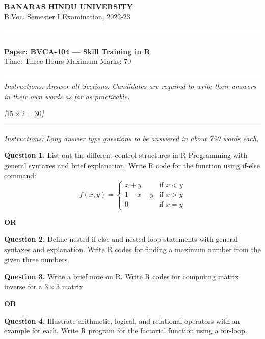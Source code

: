 \documentclass[11pt,a4paper]{article}
\newcommand{\pts}[1]{\hfill   \textit{[#1]}}
\begin{document}
\begin{center}
  {\large\bfseries BANARAS HINDU UNIVERSITY}\\[2pt]
  {\normalsize B.Voc. Semester I Examination, 2022-23}\\[6pt]
  \rule{0.8\linewidth}{0.5pt}\\[6pt]
  {\large\bfseries Paper: BVCA-104 --- Skill Training in R}\\[4pt]
  {\normalsize Time: Three Hours \hfill Maximum Marks: 70}
\end{center}

\rule{\linewidth}{0.4pt}

\smallskip



\noindent   \textit{Instructions: Answer all Sections. Candidates are required to write their answers in their own words as far as practicable.}

\bigskip

\bigskip


\pts{$15  \times 2 = 30$}
\rule{\linewidth}{0.4pt}\smallskip




\noindent   \textit{Instructions: Long answer type questions to be answered in about 750 words each.}

\medskip


\noindent   \textbf{Question 1.} List out the different control structures in R Programming with general syntaxes and brief explanation. Write R code for the function using if-else command:
\[
f(x, y) = 
\begin{cases}
x + y &  \text{if } x < y \\
1 - x - y &  \text{if } x > y \\
0 &  \text{if } x = y
\end{cases}
\]
\centerline{   \textbf{OR}}

\medskip


\noindent   \textbf{Question 2.} Define nested if-else and nested loop statements with general syntaxes and explanation. Write R codes for finding a maximum number from the given three numbers.

\medskip


\noindent   \textbf{Question 3.} Write a brief note on R. Write R codes for computing matrix inverse for a $3  \times 3$ matrix.
\centerline{   \textbf{OR}}

\medskip


\noindent   \textbf{Question 4.} Illustrate arithmetic, logical, and relational operators with an example for each. Write R program for the factorial function using a for-loop.
\end{document}
